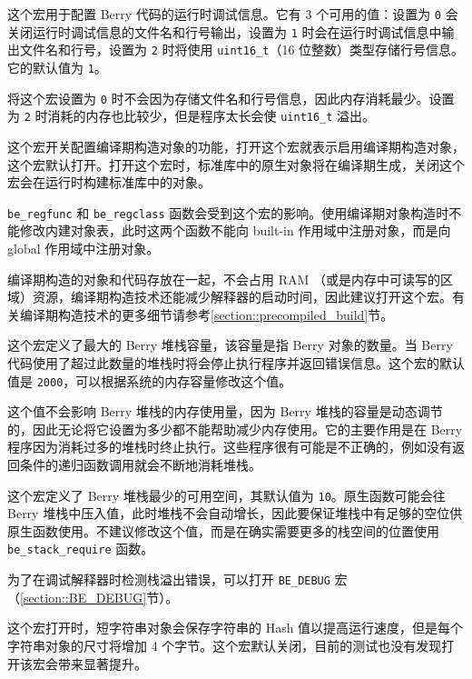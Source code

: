 
这个宏用于配置 Berry 代码的运行时调试信息。它有 3 个可用的值：设置为 \texttt{0} 会关闭运行时调试信息的文件名和行号输出，设置为 \texttt{1} 时会在运行时调试信息中输出文件名和行号，设置为 \texttt{2} 时将使用 \texttt{uint16\_t}（16 位整数）类型存储行号信息。它的默认值为 \texttt{1}。

将这个宏设置为 \texttt{0} 时不会因为存储文件名和行号信息，因此内存消耗最少。设置为 \texttt{2} 时消耗的内存也比较少，但是程序太长会使 \texttt{uint16\_t} 溢出。


这个宏开关配置编译期构造对象的功能，打开这个宏就表示启用编译期构造对象，这个宏默认打开。打开这个宏时，标准库中的原生对象将在编译期生成，关闭这个宏会在运行时构建标准库中的对象。

\texttt{be\_regfunc} 和 \texttt{be\_regclass} 函数会受到这个宏的影响。使用编译期对象构造时不能修改内建对象表，此时这两个函数不能向 built-in 作用域中注册对象，而是向 global 作用域中注册对象。

编译期构造的对象和代码存放在一起，不会占用 RAM （或是内存中可读写的区域）资源，编译期构造技术还能减少解释器的启动时间，因此建议打开这个宏。有关编译期构造技术的更多细节请参考\ref{section::precompiled_build}节。


这个宏定义了最大的 Berry 堆栈容量，该容量是指 Berry 对象的数量。当 Berry 代码使用了超过此数量的堆栈时将会停止执行程序并返回错误信息。这个宏的默认值是 \texttt{2000}，可以根据系统的内存容量修改这个值。

这个值不会影响 Berry 堆栈的内存使用量，因为 Berry 堆栈的容量是动态调节的，因此无论将它设置为多少都不能帮助减少内存使用。它的主要作用是在 Berry 程序因为消耗过多的堆栈时终止执行。这些程序很有可能是不正确的，例如没有返回条件的递归函数调用就会不断地消耗堆栈。


这个宏定义了 Berry 堆栈最少的可用空间，其默认值为 \texttt{10}。原生函数可能会往 Berry 堆栈中压入值，此时堆栈不会自动增长，因此要保证堆栈中有足够的空位供原生函数使用。不建议修改这个值，而是在确实需要更多的栈空间的位置使用 \texttt{be\_stack\_require} 函数。

为了在调试解释器时检测栈溢出错误，可以打开 \texttt{BE\_DEBUG} 宏（\ref{section::BE_DEBUG}节）。


这个宏打开时，短字符串对象会保存字符串的 Hash 值以提高运行速度，但是每个字符串对象的尺寸将增加 4 个字节。这个宏默认关闭，目前的测试也没有发现打开该宏会带来显著提升。

